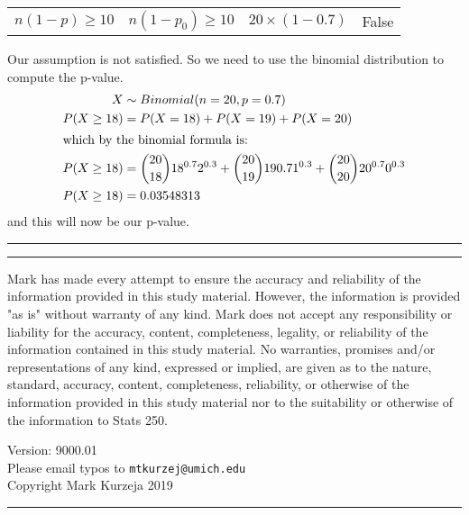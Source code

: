 \documentclass[landscape]{article}
\newcommand{\myline}{\vspace{4pt}\hrule  \vspace{4pt}}
\newenvironment{topic}[1]{
	\noindent \textbf{\textsc{\color{harvardcrimson}{#1}}}
	\noindent \hspace{-3.5pt}
}{
	\myline
}
\newenvironment{compactitem}{
	\begin{itemize}[leftmargin=*,labelsep=5pt]
	}{
	\end{itemize}
}
\begin{document}
\begin{multicols*}{3}
\begin{topic}{One Proportion Test Assumptions}
\begin{compactitem}
\begin{center}
\begin{tabular}{cccc}
					$ n(1-p) \geq 10 $    &    $ n(1-p_0) \geq 10 $   &     $ 20 \times (1-0.7) $   & False
				\end{tabular}
			\end{center}
			Our assumption is not satisfied. So we need to use the binomial distribution to compute the p-value. 
			\begin{align*}
				X &\sim Binomial(n = 20, p = 0.7)\\
				P(X \geq 18) &= P(X = 18) + P(X = 19) + P(X = 20)\\
				\intertext{which by the binomial formula is:}
				P(X \geq 18) &= \binom{20}{18} 18^{0.7} 2^{0.3} + \binom{20}{19} 19{0.7} 1^{0.3} + \binom{20}{20} 20^{0.7} 0^{0.3}\\
				P(X \geq 18) &= 0.03548313
			\end{align*}
			and this will now be our p-value.
		\end{compactitem}
	\end{topic}
	
	\begin{topic}{}
		
	\end{topic}
	
	
	\begin{topic}{Disclaimer} \tiny
		Mark has made every attempt to ensure the accuracy and reliability of the information provided in this study material. However, the information is provided "as is" without warranty of any kind. Mark does not accept any responsibility or liability for the accuracy, content, completeness, legality, or reliability of the information contained in this study material.
		No warranties, promises and/or representations of any kind, expressed or implied, are given as to the nature, standard, accuracy, content, completeness, reliability, or otherwise of the information provided in this study material nor to the suitability or otherwise of the information to Stats 250. 
		\begin{center}
			Version: 9000.01\\
			Please email typos to \texttt{mtkurzej@umich.edu}\\
			Copyright Mark Kurzeja 2019				
		\end{center}
	
	
	\end{topic}

		

\end{multicols*}
\end{document}

